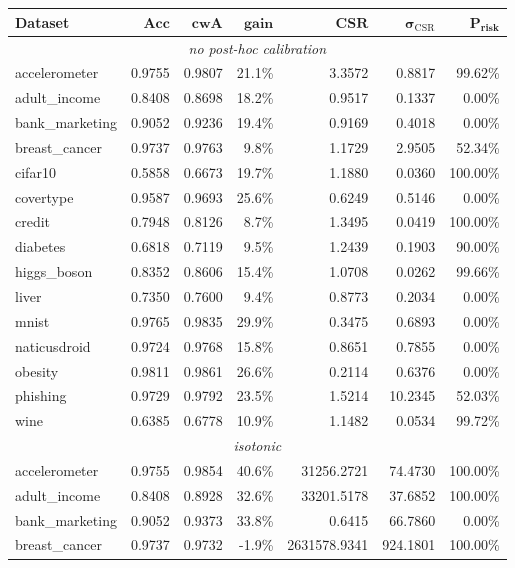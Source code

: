 \documentclass{article}
\theoremstyle{plain}
\theoremstyle{definition}
\theoremstyle{remark}
\begin{document}
\begin{table}[ht]
\centering
\small
\label{tab:report_2}
\begin{tabular}{lrrrrrr}
\toprule
\textbf{Dataset} & $\textbf{Acc}$ & $\textbf{cwA}$ & $\textbf{gain}$ & $\textbf{CSR}$ & $\boldsymbol{\sigma}_{\mathrm{CSR}}$ & $\textbf{P}_{\textbf{risk}}$ \\
\midrule
\multicolumn{7}{c}{\textit{no post-hoc calibration}} \\
\midrule
accelerometer & 0.9755 & 0.9807 & 21.1\% & 3.3572 & 0.8817 & 99.62\% \\
adult\_income & 0.8408 & 0.8698 & 18.2\% & 0.9517 & 0.1337 & 0.00\% \\
bank\_marketing & 0.9052 & 0.9236 & 19.4\% & 0.9169 & 0.4018 & 0.00\% \\
breast\_cancer & 0.9737 & 0.9763 & 9.8\% & 1.1729 & 2.9505 & 52.34\% \\
cifar10 & 0.5858 & 0.6673 & 19.7\% & 1.1880 & 0.0360 & 100.00\% \\
covertype & 0.9587 & 0.9693 & 25.6\% & 0.6249 & 0.5146 & 0.00\% \\
credit & 0.7948 & 0.8126 & 8.7\% & 1.3495 & 0.0419 & 100.00\% \\
diabetes & 0.6818 & 0.7119 & 9.5\% & 1.2439 & 0.1903 & 90.00\% \\
higgs\_boson & 0.8352 & 0.8606 & 15.4\% & 1.0708 & 0.0262 & 99.66\% \\
liver & 0.7350 & 0.7600 & 9.4\% & 0.8773 & 0.2034 & 0.00\% \\
mnist & 0.9765 & 0.9835 & 29.9\% & 0.3475 & 0.6893 & 0.00\% \\
naticusdroid & 0.9724 & 0.9768 & 15.8\% & 0.8651 & 0.7855 & 0.00\% \\
obesity & 0.9811 & 0.9861 & 26.6\% & 0.2114 & 0.6376 & 0.00\% \\
phishing & 0.9729 & 0.9792 & 23.5\% & 1.5214 & 10.2345 & 52.03\% \\
wine & 0.6385 & 0.6778 & 10.9\% & 1.1482 & 0.0534 & 99.72\% \\
\midrule
\multicolumn{7}{c}{\textit{isotonic}} \\
\midrule
accelerometer & 0.9755 & 0.9854 & 40.6\% & 31256.2721 & 74.4730 & 100.00\% \\
adult\_income & 0.8408 & 0.8928 & 32.6\% & 33201.5178 & 37.6852 & 100.00\% \\
bank\_marketing & 0.9052 & 0.9373 & 33.8\% & 0.6415 & 66.7860 & 0.00\% \\
breast\_cancer & 0.9737 & 0.9732 & -1.9\% & 2631578.9341 & 924.1801 & 100.00\% \\

\end{tabular}
\end{table}
\end{document}
